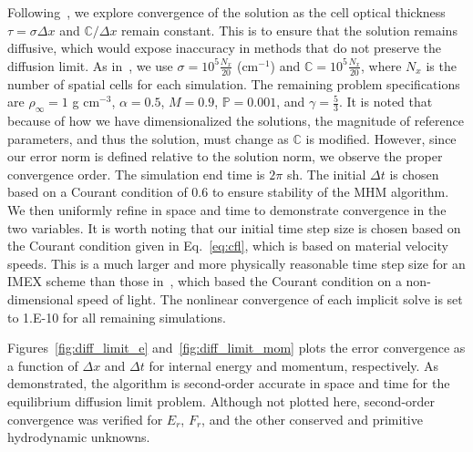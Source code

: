 \documentclass[preprint,12pt]{elsarticle}
\newcommand{\E}{{E_r}}
\newcommand{\F}{{F_r}}
\begin{document}
Following~\cite{mcclarren2}, we explore convergence of the solution as the cell optical thickness $\tau=\sigma \Delta x$ and
$\mathbb{C}/\Delta x$ remain constant.  This is to ensure that the solution remains diffusive, which would expose inaccuracy in methods that
do not preserve the diffusion limit.  As in~\cite{mcclarren2}, we use $\sigma=10^5\frac{N_x}{20}$ (cm$^{-1}$) and $\mathbb{C}=10^5\frac{N_x}{20}$,
where $N_x$ is the number of spatial cells for each simulation.  The remaining problem specifications are $\rho_{\infty}=1$ g cm$^{-3}$,
$\alpha=0.5$, $M=0.9$, $\mathbb{P}=0.001$, 
and $\gamma=\frac{5}{3}$.    It is noted that because of how we have dimensionalized the solutions, the magnitude of reference parameters, and
thus the solution, must change as $\mathbb{C}$ is modified.  However, since our error norm is defined relative to the solution
norm, we observe the proper
convergence order. The simulation end time is $2\pi$ sh. The initial $\Delta t$ is
chosen based on a Courant condition of 0.6 to ensure stability
of the MHM algorithm. We
then uniformly refine in space and time to demonstrate convergence in the two variables.  It is worth noting that our initial time step size is chosen based on
the Courant condition given in Eq.~\eqref{eq:cfl}, which is based on material velocity speeds.  This is a much larger and more physically reasonable
time step size for an IMEX scheme than those in~\cite{mcclarren2}, which based the
Courant condition on a non-dimensional speed of light.   The nonlinear
convergence of each implicit solve is set to 1.E-10 for all remaining simulations.

Figures~\ref{fig:diff_limit_e} and~\ref{fig:diff_limit_mom} plots the error convergence as a function of $\Delta x$ and $\Delta t$ for
internal energy and momentum, respectively.  As demonstrated, the algorithm is second-order accurate in space and time for the equilibrium diffusion limit problem.  Although not plotted here,
second-order convergence
was verified for $\E$, $\F$, and the other conserved and primitive hydrodynamic unknowns.
\end{document}
